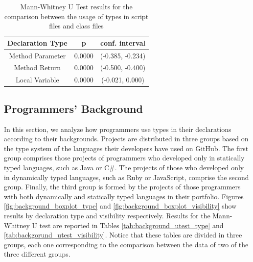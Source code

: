 \documentclass[preprint]{sigplanconf}
\begin{document}
\begin{table}[ht]
\centering{}%
\begin{tabular}{|c|c|c|}
\hline 
Declaration Type & p & conf. interval \\
\hline 
\hline 
Method Parameter              & 0.0000	& (-0.385, -0.234) \\ \hline
Method Return                 & 0.0000	& (-0.500, -0.400) \\ \hline
Local Variable                & 0.0000	& (-0.021, 0.000)  \\ \hline
\end{tabular}
\caption{Mann-Whitney U Test results for the comparison between the usage of types in script files and class files}
\label{tab:script_utest_all}
\end{table}



\subsection{Programmers' Background\label{sec:results-background}}
In this section, we analyze how programmers use types in their declarations according to their backgrounds.
Projects are distributed in three groups based on the type system of the languages their developers have used on GitHub.
The first group comprises those projects of programmers who developed only in statically typed languages, such as Java or C\#.
The projects of those who developed only in dynamically typed languages, such as Ruby or JavaScript, comprise the second group.
Finally, the third group is formed by the projects of those programmers with both dynamically and statically typed languages in their portfolio.
Figures \ref{fig:background_boxplot_type} and \ref{fig:background_boxplot_visibility}  show results by declaration type and visibility respectively.
Results for the Mann-Whitney U test are reported in Tables \ref{tab:background_utest_type} and \ref{tab:backgorund_utest_visibility}.
Notice that these tables are divided in three groups, each one corresponding to the comparison between the data of two of the three different groups.
\end{document}
